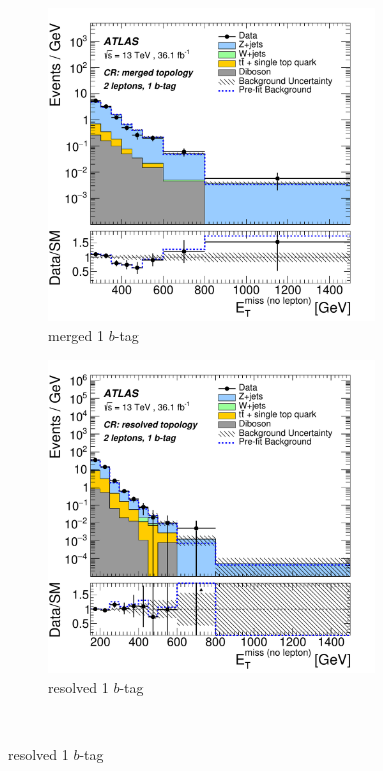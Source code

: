 \begin{figure}[htbp]
  \begin{subfigure}{0.45\textwidth}
    \centering
    \includegraphics[width=0.95\textwidth]{figures/monoV/results/figaux_09c.pdf}
    \caption{merged 1 \(b\)-tag}
  \end{subfigure}
  \begin{subfigure}{0.45\textwidth}
    \centering
    \includegraphics[width=0.95\textwidth]{figures/monoV/results/figaux_09d.pdf}
    \caption{resolved 1 \(b\)-tag}
  \end{subfigure} \\


\end{figure}
